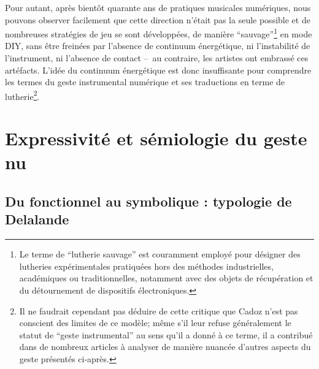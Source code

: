 \indent Pour autant, après bientôt quarante ans de pratiques musicales numériques, nous pouvons observer facilement que cette direction n'était pas la seule possible et de nombreuses stratégies de jeu se sont développées, de manière ``sauvage''\footnote{Le terme de ``lutherie sauvage'' est couramment employé pour désigner des lutheries expérimentales pratiquées hors des méthodes industrielles, académiques ou traditionnelles, notamment avec des objets de récupération et du détournement de dispositifs électroniques.} en mode \gls{DIY}, sans être freinées par l'absence de continuum énergétique, ni l'instabilité de l'instrument, ni l'absence de contact --~au contraire, les artistes ont embrassé ces artéfacts. L'idée du continuum énergétique est donc insuffisante pour comprendre les termes du geste instrumental numérique et ses traductions en terme de lutherie\footnote{Il ne faudrait cependant pas déduire de cette critique que Cadoz n'est pas conscient des limites de ce modèle; même s'il leur refuse généralement le statut de ``geste instrumental'' au sens qu'il a donné à ce terme, il a contribué dans de nombreux articles à analyser de manière nuancée d'autres aspects du geste présentés ci-après.}.


\section{Expressivité et sémiologie du geste nu}

\subsection{Du fonctionnel au symbolique : typologie de Delalande}

